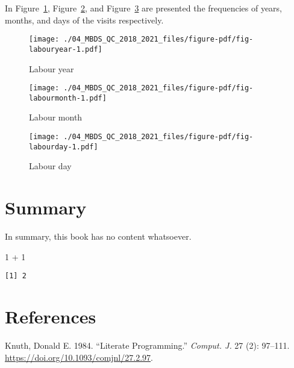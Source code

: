 \documentclass[
  letterpaper,
  DIV=11,
  numbers=noendperiod]{scrreprt}
\newenvironment{Shaded}{\begin{snugshade}}{\end{snugshade}}
\newcommand{\DecValTok}[1]{\textcolor[rgb]{0.68,0.00,0.00}{#1}}
\newcommand{\SpecialCharTok}[1]{\textcolor[rgb]{0.37,0.37,0.37}{#1}}
\newlength{\cslhangindent}
\newlength{\cslentryspacingunit} %
\newenvironment{CSLReferences}[2] %
 {%
  \setlength{\parindent}{0pt}
  \ifodd #1
  \let\oldpar\par
  \def\par{\hangindent=\cslhangindent\oldpar}
  \fi
  \setlength{\parskip}{#2\cslentryspacingunit}
 }%
 {}
\begin{document}
In Figure~\ref{fig-labouryear}, Figure~\ref{fig-labourmonth}, and
Figure~\ref{fig-labourday} are presented the frequencies of years,
months, and days of the visits respectively.

\begin{figure}

{\centering \texttt{[image: ./04\_MBDS\_QC\_2018\_2021\_files/figure-pdf/fig-labouryear-1.pdf]}

}

\caption{\label{fig-labouryear}Labour year}

\end{figure}

\begin{figure}

{\centering \texttt{[image: ./04\_MBDS\_QC\_2018\_2021\_files/figure-pdf/fig-labourmonth-1.pdf]}

}

\caption{\label{fig-labourmonth}Labour month}

\end{figure}

\begin{figure}

{\centering \texttt{[image: ./04\_MBDS\_QC\_2018\_2021\_files/figure-pdf/fig-labourday-1.pdf]}

}

\caption{\label{fig-labourday}Labour day}

\end{figure}


\hypertarget{summary}{%
\chapter{Summary}\label{summary}}

In summary, this book has no content whatsoever.

\begin{Shaded}
\begin{Highlighting}[]
\DecValTok{1} \SpecialCharTok{+} \DecValTok{1}
\end{Highlighting}
\end{Shaded}

\begin{verbatim}
[1] 2
\end{verbatim}


\hypertarget{references}{%
\chapter*{References}\label{references}}


\hypertarget{refs}{}
\begin{CSLReferences}{1}{0}
\leavevmode{}%
Knuth, Donald E. 1984. {``Literate Programming.''} \emph{Comput. J.} 27
(2): 97--111. \url{https://doi.org/10.1093/comjnl/27.2.97}.

\end{CSLReferences}
\end{document}
